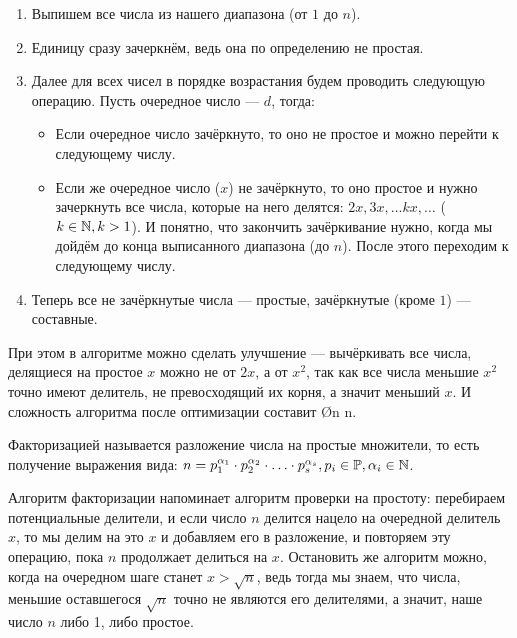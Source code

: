 \begin{box-algo}
    \begin{enumerate}
        \item Выпишем все числа из нашего диапазона (от $1$ до $n$).
        \item Единицу сразу зачеркнём, ведь она по определению не простая.
        \item Далее для всех чисел в порядке возрастания будем проводить следующую операцию. Пусть очередное число — $d$, тогда:
            \begin{itemize}
                \item Если очередное число зачёркнуто, то оно не простое и можно перейти к следующему числу.
                \item Если же очередное число ($x$) не зачёркнуто, то оно простое и нужно зачеркнуть все числа, которые на него делятся: $2x, 3x, \ldots kx, \ldots$ ($k \in \mathbb{N}, k > 1$). И понятно, что закончить зачёркивание нужно, когда мы дойдём до конца выписанного диапазона (до $n$). После этого переходим к следующему числу.
            \end{itemize}
        \item Теперь все не зачёркнутые числа — простые, зачёркнутые (кроме $1$) — составные.
    \end{enumerate}
\end{box-algo}

При этом в алгоритме можно сделать улучшение — вычёркивать все числа, делящиеся на простое $x$ можно не от $2x$, а от $x^2$, так как все числа меньшие $x^2$ точно имеют делитель, не превосходящий их корня, а значит меньший $x$. И сложность алгоритма после оптимизации составит \O{n \log\log n}.


Факторизацией называется разложение числа на простые множители, то есть получение выражения вида: $n = p_1^{\alpha_1} \cdot p_2^{\alpha_2} \cdot \ldots \cdot p_s^{\alpha_s}, p_i \in \mathbb{P}, \alpha_i \in \mathbb{N}$.

Алгоритм факторизации напоминает алгоритм проверки на простоту: перебираем потенциальные делители, и если число $n$ делится нацело на очередной делитель $x$, то мы делим на это $x$ и добавляем его в разложение, и повторяем эту операцию, пока $n$ продолжает делиться на $x$. Остановить же алгоритм можно, когда на очередном шаге станет $x > \sqrt{n}$, ведь тогда мы знаем, что числа, меньшие оставшегося $\sqrt{n}$ точно не являются его делителями, а значит, наше число $n$ либо 1, либо простое.

